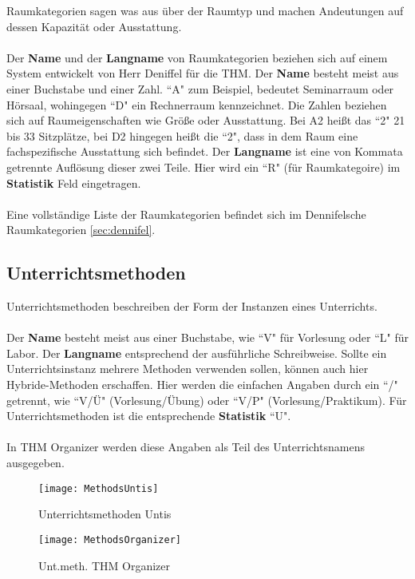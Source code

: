 \documentclass[]{report}
\begin{document}
Raumkategorien sagen was aus über der Raumtyp und machen Andeutungen auf dessen Kapazität oder Ausstattung.\\
\\
Der \textbf{Name} und der \textbf{Langname} von Raumkategorien beziehen sich auf einem System entwickelt von Herr Deniffel für die THM. Der \textbf{Name} besteht meist aus einer Buchstabe und einer Zahl. ``A" zum Beispiel, bedeutet Seminarraum oder Hörsaal, wohingegen ``D" ein Rechnerraum kennzeichnet. Die Zahlen beziehen sich auf Raumeigenschaften wie Größe oder Ausstattung. Bei A2 heißt das ``2" 21 bis 33 Sitzplätze, bei D2 hingegen heißt die ``2", dass in dem Raum eine fachspezifische Ausstattung sich befindet. Der \textbf{Langname} ist eine von Kommata getrennte Auflösung dieser zwei Teile. Hier wird ein ``R" (für Raumkategoire) im \textbf{Statistik} Feld eingetragen.\\
\\
Eine vollständige Liste der Raumkategorien befindet sich im Dennifelsche Raumkategorien \ref{sec:dennifel}.

\newpage
\subsection{Unterrichtsmethoden}

Unterrichtsmethoden beschreiben der Form der Instanzen eines Unterrichts.\\
\\
Der \textbf{Name} besteht meist aus einer Buchstabe, wie ``V" für Vorlesung oder ``L" für Labor. Der \textbf{Langname} entsprechend der ausführliche Schreibweise. Sollte ein Unterrichtsinstanz mehrere Methoden verwenden sollen, können auch hier Hybride-Methoden erschaffen. Hier werden die einfachen Angaben durch ein ``/" getrennt, wie ``V/Ü" (Vorlesung/Übung) oder ``V/P" (Vorlesung/Praktikum). Für Unterrichtsmethoden ist die entsprechende \textbf{Statistik} ``U".\\
\\
In THM Organizer werden diese Angaben als Teil des Unterrichtsnamens ausgegeben.

\begin{figure}[htbp]
	\begin{minipage}{0.5\linewidth} 
		\centering
		\texttt{[image: MethodsUntis]}
		\vspace{-5pt}
		\caption{Unterrichtsmethoden Untis}
		\label{fig:methoden-untis}
	\end{minipage}
	\begin{minipage}{0.5\linewidth}
		\centering
		\texttt{[image: MethodsOrganizer]}
		\caption{Unt.meth. THM Organizer}
		\label{fig:methoden-organizer}
	\end{minipage}
\end{figure}
\end{document}
